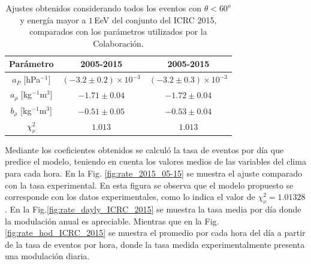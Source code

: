         \begin{table}[H]
            \centering
            \begin{tabular}{c|c|c}
            {Parámetro}                 & {2005-2015}                   & {2005-2015}    \cite{aab2017impact}              \\ \hline \hline
            $a_P$ [hPa$^{-1}$]          & $(-3.2 \pm 0.2)\times 10^{-3}$& $(-3.2 \pm 0.3)\times 10^{-3}$    \\ \hline
            $a_\rho$ [kg$^{-1}$m$^3$]   & $-1.71 \pm 0.04 $             & $-1.72 \pm 0.04$                  \\ \hline
            $b_\rho$ [kg$^{-1}$m$^3$]   & $-0.51 \pm 0.05$              & $-0.53 \pm 0.04$                  \\ \hline
            $\chi^2_\nu$                & $1.013$                       & $1.013$                           \\ 
            \end{tabular} 
            \caption{Ajustes obtenidos considerando todos los eventos con $\theta<60^o$ y energía mayor a $1\,$EeV del conjunto del ICRC 2015, comparados con los parámetros utilizados por la Colaboración.} \label{tabla:parametros_ICRC_2015}
        \end{table}

        Mediante los coeficientes obtenidos se calculó la tasa de eventos por día que predice el modelo, teniendo en cuenta los valores medios de las variables del clima para cada hora. En la Fig. \ref{fig:rate_2015_05-15} se muestra el ajuste comparado con la tasa experimental. En esta figura se observa que el modelo propuesto se corresponde con los datos experimentales, como lo indica el valor de $\chi^2_\nu=1.01328$. En la Fig.\ref{fig:rate_dayly_ICRC_2015} se muestra la tasa media por día donde la modulación anual es apreciable. Mientras que en la Fig.\ref{fig:rate_hod_ICRC_2015} se muestra el promedio por cada hora del día a partir de la tasa de eventos por hora, donde la tasa medida experimentalmente presenta una modulación diaria. 
        

